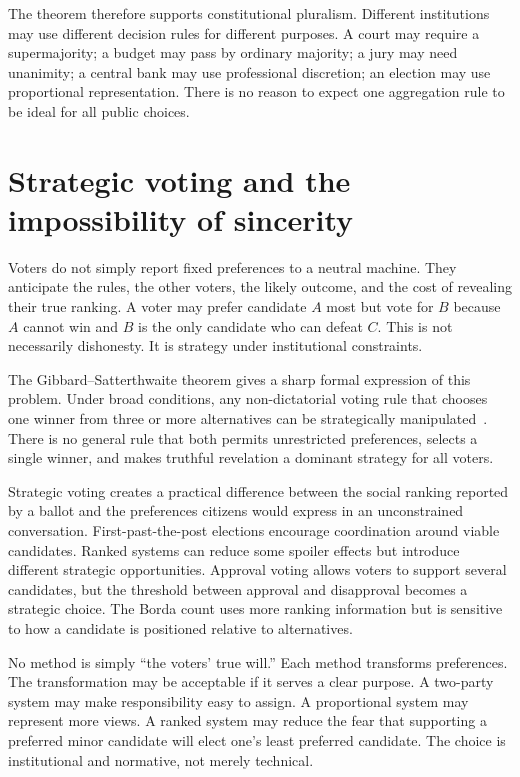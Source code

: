 ﻿\documentclass[12pt,a4paper]{book}
\begin{document}
The theorem therefore supports constitutional pluralism.  Different
institutions may use different decision rules for different purposes.  A
court may require a supermajority; a budget may pass by ordinary majority;
a jury may need unanimity; a central bank may use professional discretion;
an election may use proportional representation.  There is no reason to
expect one aggregation rule to be ideal for all public choices.

\section{Strategic voting and the impossibility of sincerity}

Voters do not simply report fixed preferences to a neutral machine.  They
anticipate the rules, the other voters, the likely outcome, and the cost of
revealing their true ranking.  A voter may prefer candidate $A$ most but
vote for $B$ because $A$ cannot win and $B$ is the only candidate who can
defeat $C$.  This is not necessarily dishonesty.  It is strategy under
institutional constraints.

The Gibbard--Satterthwaite theorem gives a sharp formal expression of this
problem.  Under broad conditions, any non-dictatorial voting rule that
chooses one winner from three or more alternatives can be strategically
manipulated~\cite{Gibbard1973,Satterthwaite1975}.  There is no general rule
that both permits unrestricted preferences, selects a single winner, and
makes truthful revelation a dominant strategy for all voters.

Strategic voting creates a practical difference between the social ranking
reported by a ballot and the preferences citizens would express in an
unconstrained conversation.  First-past-the-post elections encourage
coordination around viable candidates.  Ranked systems can reduce some
spoiler effects but introduce different strategic opportunities.  Approval
voting allows voters to support several candidates, but the threshold between
approval and disapproval becomes a strategic choice.  The Borda count uses
more ranking information but is sensitive to how a candidate is positioned
relative to alternatives.

No method is simply ``the voters' true will.''  Each method transforms
preferences.  The transformation may be acceptable if it serves a clear
purpose.  A two-party system may make responsibility easy to assign.  A
proportional system may represent more views.  A ranked system may reduce
the fear that supporting a preferred minor candidate will elect one's least
preferred candidate.  The choice is institutional and normative, not
merely technical.
\end{document}
